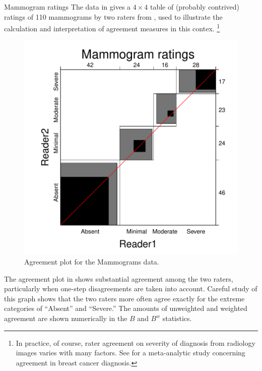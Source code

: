 \documentclass[11pt]{book}
\renewenvironment{knitrout}{\small\renewcommand{\baselinestretch}{.85}}{} %
\begin{document}
\begin{Example}[mammograms]{Mammogram ratings}
The  data in  gives a $4 \times 4$ table
of (probably contrived) ratings of 110 mammograms by two raters from
\citet{KundelPolansky:2003}, used to illustrate the calculation
and interpretation of agreement measures in this contex.%
\footnote{
In practice, of course, rater agreement on severity of diagnosis from
radiology images varies with many factors.  See \citet{AntonioCrespi:2010}
for a meta-analytic study concerning agreement in breast cancer diagnosis.
}

\begin{knitrout}
\color{fgcolor}\begin{kframe}
\begin{alltt}
\hlstd{(}\hlstd{,} \hlstd{=}\hlstd{)}
 \hlkwb{<-}  \hlstd{=}\hlstd{)}
\end{alltt}
\end{kframe}\begin{figure}[!htbp]


\centerline{\includegraphics[width=.6\textwidth]{ch04/fig/mammograms1} }

\caption[Agreement plot for the Mammograms data]{Agreement plot for the Mammograms data.\label{fig:mammograms1}}
\end{figure}


\end{knitrout}
The agreement plot in  shows substantial agreement
among the two raters, particularly when one-step disagreements are taken into
account.  Careful study of this graph shows that the two raters more often
agree exactly for the extreme categories of ``Absent'' and ``Severe.''
The amounts of unweighted and weighted
agreement are shown numerically in the $B$ and $B^w$
statistics.


\end{Example}
\end{document}
